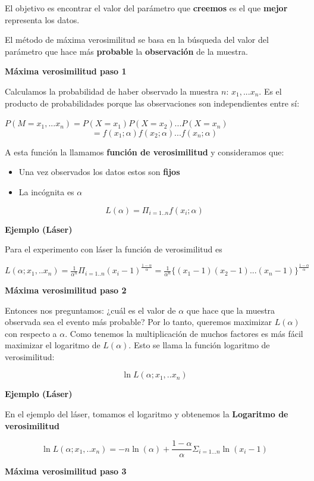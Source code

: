 \documentclass[
]{book}
\providecommand{\tightlist}{%
  \setlength{\itemsep}{0pt}\setlength{\parskip}{0pt}}
\begin{document}
El objetivo es encontrar el valor del parámetro que \textbf{creemos} es el que \textbf{mejor} representa los datos.

El método de máxima verosimilitud se basa en la búsqueda del valor del parámetro que hace más \textbf{probable} la \textbf{observación} de la muestra.

\textbf{Máxima verosimilitud paso 1}

Calculamos la probabilidad de haber observado la muestra \(n\): \(x_1,...x_n\). Es el producto de probabilidades porque las observaciones son independientes entre sí:

\(P(M=x_1,...x_n)=P(X=x_1)P(X=x_2)...P(X=x_n)\)
\[=f(x_1;\alpha)f(x_2;\alpha) ...f(x_n;\alpha)\]

A esta función la llamamos \textbf{función de verosimilitud} y consideramos que:

\begin{itemize}
\tightlist
\item
  Una vez observados los datos estos son \textbf{fijos}
\item
  La incógnita es \(\alpha\)
\end{itemize}

\[L(\alpha)= \Pi_{i=1..n} f(x_i; \alpha)\]

\textbf{Ejemplo (Láser)}

Para el experimento con láser la función de verosimilitud es

\(L(\alpha;x_1,..x_n)= \frac{1}{\alpha^n} \Pi_{i=1..n} (x_i-1)^{\frac{1-\alpha}{ \alpha}}= \frac{1}{\alpha^n} \{(x_1-1)(x_2-1)...(x_n-1)\}^{\frac{1-\alpha}{\alpha}}\)

\textbf{Máxima verosimilitud paso 2}

Entonces nos preguntamos: ¿cuál es el valor de \(\alpha\) que hace que la muestra observada sea el evento más probable? Por lo tanto, queremos maximizar \(L(\alpha)\) con respecto a \(\alpha\). Como tenemos la multiplicación de muchos factores es más fácil maximizar el logaritmo de \(L(\alpha)\). Esto se llama la función logaritmo de verosimilitud:

\[\ln L(\alpha;x_1,..x_n)\]

\textbf{Ejemplo (Láser)}

En el ejemplo del láser, tomamos el logaritmo y obtenemos la \textbf{Logaritmo de verosimilitud}

\[\ln L(\alpha;x_1,..x_n)= -n \ln(\alpha) + {\frac{1-\alpha}{\alpha}} \Sigma_{i=1...n} \ln (x_i-1)\]

\textbf{Máxima verosimilitud paso 3}
\end{document}
